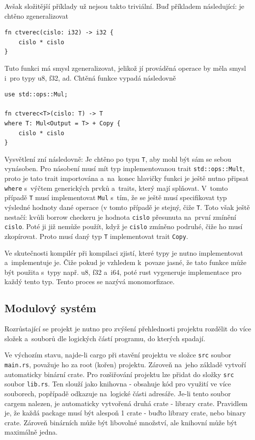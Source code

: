 \documentclass[a4paper, 12pt, twoside]{article} %
\newcommand{\rust}[1]{\texttt{#1}}
\begin{document}
		Avšak složitější příklady už nejsou takto triviální. Buď příkladem následující: je chtěno zgeneralizovat
		\begin{verbatim}
fn ctverec(cislo: i32) -> i32 {
	cislo * cislo
}
		\end{verbatim}
		
		Tuto funkci má smysl zgeneralizovat, jelikož jí prováděná operace by měla smysl i~pro typy u8, f32, ad. Chtěná funkce vypadá následovně
		\begin{verbatim}
use std::ops::Mul;

fn ctverec<T>(cislo: T) -> T
where T: Mul<Output = T> + Copy {
	cislo * cislo
}
		\end{verbatim}
		
		Vysvětlení zní následovně: Je chtěno po typu \texttt{T}, aby mohl být sám se sebou vynásoben. Pro násobení musí mít typ implementovanou trait \rust{std::ops::Mult}, proto je tato trait importována a~na~konec hlavičky funkci je ještě nutno připsat \rust{where} s~výčtem generických prvků a~traits, který mají splňovat. V~tomto případě \texttt{T} musí implementovat \rust{Mul} s~tím, že se ještě musí specifikovat typ výsledné hodnoty dané operace (v tomto případě je stejný, čiže \rust{T}. Toto však ještě nestačí: kvůli borrow checkeru je hodnota \rust{cislo} přesunuta na~první zmínění \texttt{cislo}. Poté ji již nemůže použít, když je \texttt{cislo} zmíněno podruhé, čiže ho musí zkopírovat. Proto musí daný typ \texttt{T} implementovat trait \rust{Copy}.
		
		Ve skutečnosti kompilér při kompilaci zjistí, které typy je nutno implementovat a~implementuje je. Čiže pokud je vzhledem k~povaze jasné, že tato funkce může být použita s~typy např. u8, f32 a~i64, poté rust vygeneruje implementace pro každý tento typ. Tento proces se nazývá monomorfizace.

	\subsection{Modulový systém}
		Rozrůstající se projekt je nutno pro zvýšení přehlednosti projektu rozdělit do více složek a~souborů dle logických částí programu, do kterých spadají.
		
		Ve výchozím stavu, najde-li cargo při stavění projektu ve složce \texttt{src} soubor \texttt{main.rs}, považuje ho za root (kořen) projektu. Zároveň na~jeho základě vytvoří automaticky binární crate. Pro rozšiřování projektu lze přidat do složky \texttt{src} soubor \rust{lib.rs}. Ten slouží jako knihovna - obsahuje kód pro využití ve více souborech, popřípadě odkazuje na~logické části adresáře. Je-li tento soubor cargem nalezen, je automaticky vytvořená druhá crate - library crate. Pravidlem je, že každá package musí být alespoň 1 crate - buďto library crate, nebo binary crate. Zároveň binárních může být libovolné množství, ale knihovní může být maximálně jedna.
		
\end{document}
